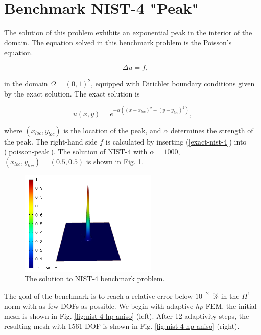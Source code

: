 \section{Benchmark NIST-4 "Peak"}
\label{sec:bench-4}

The solution of this problem exhibits an exponential peak in the interior of the domain.
The equation solved in this benchmark problem is the Poisson's equation.

\begin{equation} \label{poisson-peak}
-\Delta u = f,
\end{equation}

in the domain $\Omega = (0, 1)^2$, equipped with Dirichlet
boundary conditions given by the exact solution.
The exact solution is

\begin{equation}\label{exact-nist-4}
u(x,y) = e^{-\alpha ((x - x_{loc})^{2} + (y - y_{loc})^{2})},
\end{equation}

where $(x_{loc}, y_{loc})$ is the location of the peak,
and $\alpha$ determines the strength of the peak.
The right-hand side $f$ is calculated by inserting (\ref{exact-nist-4}) into (\ref{poisson-peak}).
The solution of NIST-4 with $\alpha = 1000$,
$(x_{loc}, y_{loc}) = (0.5, 0.5)$ is shown in Fig. \ref{fig:sln-nist04}.

\begin{figure}[!ht]
\centering
\includegraphics[height=5cm]{nist/nist-4/solution.png}
\caption{The solution to NIST-4 benchmark problem.}
\label{fig:sln-nist04}
\end{figure}

The goal of the benchmark is to reach a relative error below
$10^{-2}$~\% in the $H^1$-norm with as few DOFs as possible.
We begin with adaptive $hp$-FEM,
the initial mesh is shown in Fig. \ref{fig:nist-4-hp-aniso} (left).
After 12 adaptivity steps, the resulting mesh with 1561 DOF is shown
in Fig. \ref{fig:nist-4-hp-aniso} (right).


